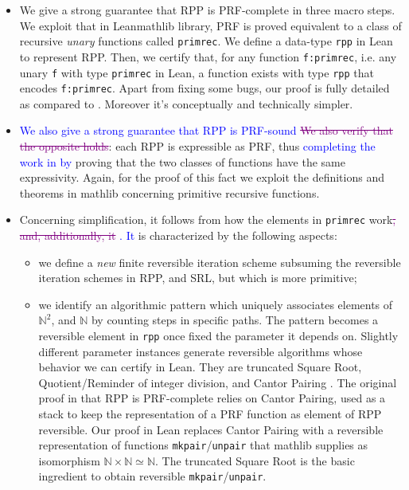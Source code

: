 \documentclass[preprint]{elsarticle}
\theoremstyle{remark}
\newcommand{\RPP}{\textsf{RPP}\xspace}
\newcommand{\PRF}{\textsf{PRF}\xspace}
\newcommand{\MATHLIB}{\textsf{mathlib}\xspace}
\newcommand{\LEAN}{\textsf{Lean}\xspace}
\newcommand{\SRL}{\textsf{SRL}\xspace}
\begin{document}
\begin{itemize}
    \item We give a strong guarantee that \RPP is \PRF-complete in three macro steps. We exploit that in \LEAN \MATHLIB library, \PRF is proved equivalent to a class of recursive \emph{unary} functions called \lstinline|primrec|. We define a data-type \lstinline|rpp| in \LEAN to represent \RPP. Then, we certify that, for any function \lstinline|f:primrec|, i.e. any unary \lstinline|f| with type \lstinline|primrec| in \LEAN, a function exists with type \lstinline|rpp| that encodes \lstinline|f:primrec|. Apart from fixing some bugs, our proof is fully detailed as compared to \cite{DBLP:journals/tcs/PaoliniPR20}. Moreover it's conceptually and technically simpler.

    \item \textcolor{blue}{We also give a strong guarantee that \RPP is \PRF-sound} \textcolor{purple}{\sout{We also verify that the opposite holds}}: each \RPP is expressible as \PRF, thus \textcolor{blue}{completing the work in \cite{MalettoR22} by} proving that the two classes of functions have the same expressivity. Again, for the proof of this fact we exploit the definitions and theorems in \MATHLIB concerning primitive recursive functions.

    \item Concerning simplification, it follows from how the elements in \lstinline|primrec| work\textcolor{purple}{\sout{, and, additionally, it}} \textcolor{blue}{. It} is characterized by the following aspects:
    \begin{itemize}
        \item we define a \emph{new} finite reversible iteration scheme subsuming the reversible iteration schemes in \RPP, and \SRL, but which is more primitive;

        \item we identify an algorithmic pattern which uniquely associates elements of
        $ \mathbb{N}^2$, and $ \mathbb{N}$ by counting steps in specific paths.
        The pattern becomes a reversible element in \lstinline|rpp| once fixed the parameter it depends on. Slightly different parameter instances generate reversible algorithms whose behavior we can certify in \LEAN. They are truncated Square Root, Quotient/Reminder of integer division, and Cantor Pairing \cite{Cantor1878,DBLP:journals/corr/Szudzik17}.
        The original proof in \cite{DBLP:journals/tcs/PaoliniPR20} that \RPP is \PRF-complete relies on Cantor Pairing, used as a stack to keep the representation of a \PRF function as element of \RPP reversible.
        Our proof in \LEAN replaces Cantor Pairing with a reversible representation of functions \lstinline|mkpair|/\lstinline|unpair| that \MATHLIB supplies as isomorphism $ \mathbb{N}\times\mathbb{N} \simeq \mathbb{N} $. The truncated Square Root is the basic ingredient to obtain reversible \lstinline|mkpair|/\lstinline|unpair|.
    \end{itemize}
\end{itemize}
\end{document}
